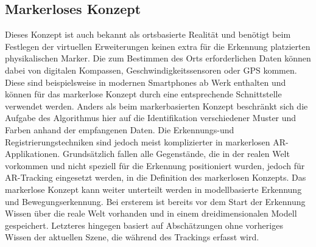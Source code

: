 \documentclass[conference]{IEEEtran}
\begin{document}
\subsection{Markerloses Konzept}
Dieses Konzept ist auch bekannt als ortsbasierte Realität und benötigt beim Festlegen der virtuellen Erweiterungen keinen extra für die Erkennung platzierten physikalischen Marker. Die zum Bestimmen des Orts erforderlichen Daten können dabei von digitalen Kompassen, Geschwindigkeitssensoren oder GPS kommen. Diese sind beispielsweise in modernen Smartphones ab Werk enthalten und können für das markerlose Konzept durch eine entsprechende Schnittstelle verwendet werden. Anders als beim markerbasierten Konzept beschränkt sich die Aufgabe des Algorithmus hier auf die Identifikation verschiedener Muster und Farben anhand der empfangenen Daten.\autocite{aggarwal2019augmented} Die Erkennungs-und Registrierungstechniken sind jedoch meist komplizierter in markerlosen AR-Applikationen. Grundsätzlich fallen alle Gegenstände, die in der realen Welt vorkommen und nicht speziell für die Erkennung positioniert wurden, jedoch für AR-Tracking eingesetzt werden, in die Definition des markerlosen Konzepts. Das markerlose Konzept kann weiter unterteilt werden in modellbasierte Erkennung und Bewegungserkennung. Bei ersterem ist bereits vor dem Start der Erkennung Wissen über die reale Welt vorhanden und in einem dreidimensionalen Modell gespeichert. Letzteres hingegen basiert auf Abschätzungen ohne vorheriges Wissen der aktuellen Szene, die während des Trackings erfasst wird.\autocite[S. 39]{lima2009model}
\end{document}
